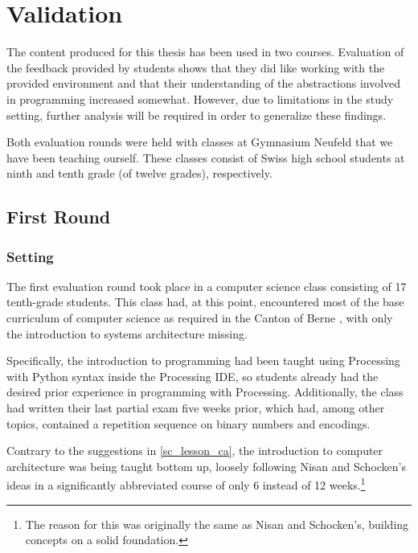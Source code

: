 
\chapter{Validation} \label{ch_practice}

The content produced for this thesis has been used in two courses. Evaluation of the feedback provided by students shows that they did like working with the provided environment and that their understanding of the abstractions involved in programming increased somewhat. However, due to limitations in the study setting, further analysis will be required in order to generalize these findings.

Both evaluation rounds were held with classes at Gymnasium Neufeld that we have been teaching ourself. These classes consist of Swiss high school students at ninth and tenth grade (of twelve grades), respectively.


\section{First Round} \label{sc_validation_ca} %

\subsection{Setting}

The first evaluation round took place in a computer science class consisting of 17 tenth-grade students. This class had, at this point, encountered most of the base curriculum of computer science as required in the Canton of Berne \cite[p.\,145--146]{Erz16}, with only the introduction to systems architecture missing.

Specifically, the introduction to programming had been taught using Processing with Python syntax inside the Processing \ac{IDE}, so students already had the desired prior experience in programming with Processing. Additionally, the class had written their last partial exam five weeks prior, which had, among other topics, contained a repetition sequence on binary numbers and encodings.

Contrary to the suggestions in \ref{sc_lesson_ca}, the introduction to computer architecture was being taught bottom up, loosely following Nisan and Schocken's ideas \cite{Nis21} in a significantly abbreviated course of only 6 instead of 12 weeks.\footnote{The reason for this was originally the same as Nisan and Schocken's, \ie building concepts on a solid foundation.}

